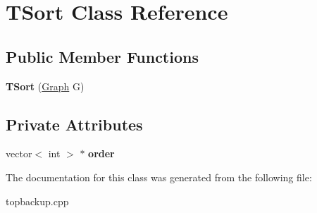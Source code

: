 \hypertarget{classTSort}{\section{T\+Sort Class Reference}
\label{classTSort}
}
\subsection*{Public Member Functions}
\begin{DoxyCompactItemize}
\item 
\hypertarget{classTSort_aab0bddf622888373f96a3d303fdd65e5}{{\bfseries T\+Sort} (\hyperlink{classGraph}{Graph} G)}\label{classTSort_aab0bddf622888373f96a3d303fdd65e5}

\end{DoxyCompactItemize}
\subsection*{Private Attributes}
\begin{DoxyCompactItemize}
\item 
\hypertarget{classTSort_a2ef8972bd1c9c325f46c8adc9e056646}{vector$<$ int $>$ $\ast$ {\bfseries order}}\label{classTSort_a2ef8972bd1c9c325f46c8adc9e056646}

\end{DoxyCompactItemize}


The documentation for this class was generated from the following file\+:\begin{DoxyCompactItemize}
\item 
topbackup.\+cpp\end{DoxyCompactItemize}
